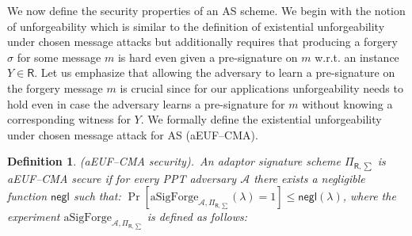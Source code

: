 \documentclass{llncs}
\newtheorem{Definition}{Definition}
\begin{document}
We now define the security properties of an AS scheme. We begin with the notion of unforgeability which is similar to the definition of existential unforgeability under chosen message attacks but additionally requires that producing a forgery $\sigma$ for some message $m$ is hard even given a pre-signature on $m$ w.r.t. an instance $Y \in \mathsf{R}$. Let us emphasize that allowing the adversary to learn a pre-signature on the forgery message $m$ is crucial since for our applications unforgeability needs to hold even in case the adversary learns a pre-signature for $m$ without knowing a corresponding witness for $Y$. We formally define the existential unforgeability under chosen message attack for AS (aEUF–CMA).

\begin{Definition}\emph{(aEUF–CMA security).}~\label{aEUF-CMA security definition}
An adaptor signature scheme $\Pi_{\mathsf{R},\sum}$ is aEUF–CMA secure if for every PPT adversary $\mathcal{A}$ there exists a negligible function $\mathsf{negl}$ such that: $\Pr[\text{aSigForge}_{\mathcal{A},\Pi_{\mathsf{R},\sum}}(\lambda) = 1] \leq \mathsf{negl}(\lambda)$, where the experiment $\text{aSigForge}_{\mathcal{A},\Pi_{\mathsf{R},\sum}}$ is defined as follows:
\end{Definition}

\begin{center}
\end{center}
\end{document}
